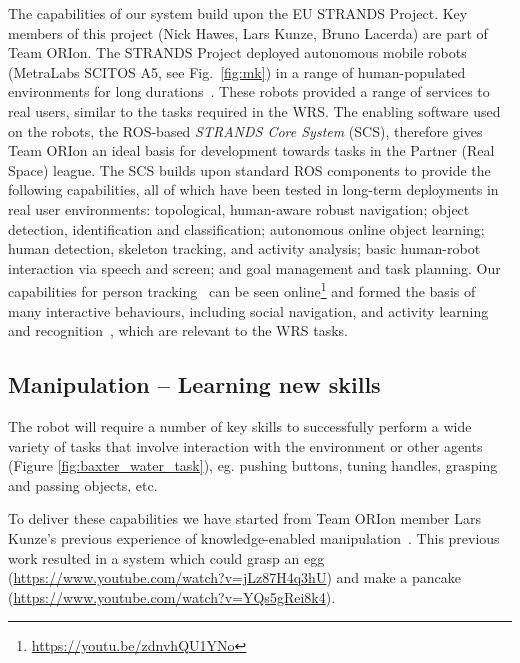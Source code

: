 \documentclass[runningheads,a4paper]{llncs}
\newcommand{\teamori}{Team ORIon}
\begin{document}
The capabilities of our system build upon the EU STRANDS Project. Key members of this project (Nick Hawes, Lars Kunze, Bruno Lacerda) are part of \teamori. The STRANDS Project deployed autonomous mobile robots (MetraLabs SCITOS A5, see Fig.~\ref{fig:mk}) in a range of human-populated environments for long durations~\cite{strands@ram}. These robots provided a range of services to real users, similar to the tasks required in the WRS. The enabling software used on the robots, the ROS-based \emph{STRANDS Core System} (SCS), therefore gives \teamori{} an ideal basis for development towards tasks in the Partner (Real Space) league. 
The SCS builds upon standard ROS components to provide the following capabilities, all of which have been tested in long-term deployments in real user environments: topological, human-aware robust navigation; object detection, identification and classification; autonomous online object learning; human detection, skeleton tracking, and activity analysis; basic human-robot interaction via speech and screen; and goal management and task planning. Our capabilities for person tracking~\cite{dondrup2015tracker} can be seen online\footnote{\url{https://youtu.be/zdnvhQU1YNo}} and formed the basis of many interactive behaviours, including social navigation, and activity learning and recognition~\cite{duckworth_aamas2016}, which are relevant to the WRS tasks. 


\subsection{Manipulation -- Learning new skills}

The robot will require a number of key skills to successfully perform a wide
variety of tasks that involve interaction with the environment or other
agents (Figure \ref{fig:baxter_water_task}), eg. pushing buttons, tuning handles, grasping and passing objects, etc. 

To deliver these capabilities we have started from \teamori{} member Lars Kunze's previous experience of knowledge-enabled manipulation~\cite{kunze15aij}. This previous work resulted in a system which could grasp an egg (\url{https://www.youtube.com/watch?v=jLz87H4q3hU}) and make a pancake (\url{https://www.youtube.com/watch?v=YQs5gRei8k4}). 
\end{document}
